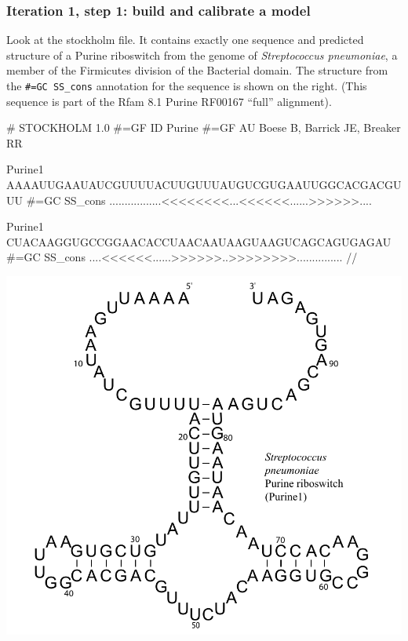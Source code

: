 \subsubsection{Iteration 1, step 1: build and calibrate a model}

Look at the  stockholm file. It contains exactly
one sequence and predicted structure of a Purine riboswitch from the
genome of \emph{Streptococcus pneumoniae}, a member of the Firmicutes
division of the Bacterial domain. The structure from the
{\small\verb+#=GC SS_cons+}
annotation for the sequence is shown on the right. 
(This sequence is part of the Rfam 8.1 Purine RF00167 ``full''
alignment). 

\vspace{1em}
\begin{minipage}{4.7in}
\begin{sreoutput}
# STOCKHOLM 1.0
#=GF ID    Purine
#=GF AU    Boese B, Barrick JE, Breaker RR

Purine1          AAAAUUGAAUAUCGUUUUACUUGUUUAUGUCGUGAAUUGGCACGACGUUU
#=GC SS_cons     .................<<<<<<<<...<<<<<<......>>>>>>....

Purine1          CUACAAGGUGCCGGAACACCUAACAAUAAGUAAGUCAGCAGUGAGAU
#=GC SS_cons     ....<<<<<<......>>>>>>..>>>>>>>>...............
//
\end{sreoutput}
\end{minipage}
\begin{minipage}{1.5in}
\includegraphics[scale=0.37]{Figures/purine1_full}
\end{minipage}
\vspace{1em}

